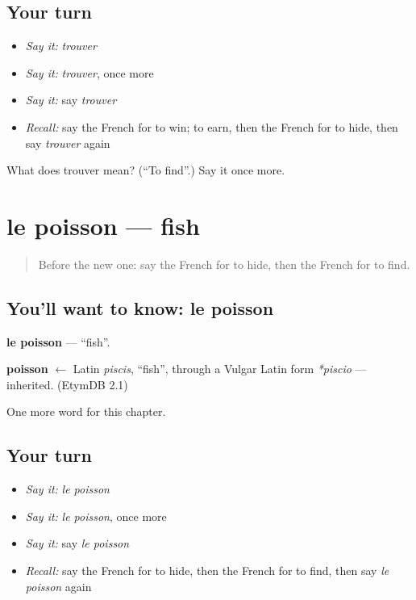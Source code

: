 \subsection*{Your turn}
\begin{itemize}
\raggedright
  \item \emph{Say it:} \emph{trouver}
  \item \emph{Say it:} \emph{trouver}, once more
  \item \emph{Say it:} say \emph{trouver}
  \item \emph{Recall:} say the French for to win; to earn, then the French for to hide, then say \emph{trouver} again
\end{itemize}

\begin{tcolorbox}[breakable,colback=teal!4,colframe=teal!35!black,title={Before you move on}]
What does trouver mean? (\textquotedblleft{}To find\textquotedblright{}.) Say it once more.
\end{tcolorbox}
\section[le poisson]{le poisson — fish}

\label{lesson:FR-C67-poisson}



\begin{quote}
Before the new one: say the French for to hide, then the French for to find.
\end{quote}

\subsection*{You'll want to know: le poisson}
\textbf{le poisson} — \textquotedblleft{}fish\textquotedblright{}.

\begin{cousinweb}
\textbf{poisson} $\leftarrow$ Latin \emph{piscis}, \textquotedblleft{}fish\textquotedblright{}, through a Vulgar Latin form \emph{*piscio} — inherited. (EtymDB 2.1)
\end{cousinweb}

\begin{grammarlens}[title={What you've built}]
One more word for this chapter.
\end{grammarlens}

\subsection*{Your turn}
\begin{itemize}
\raggedright
  \item \emph{Say it:} \emph{le poisson}
  \item \emph{Say it:} \emph{le poisson}, once more
  \item \emph{Say it:} say \emph{le poisson}
  \item \emph{Recall:} say the French for to hide, then the French for to find, then say \emph{le poisson} again
\end{itemize}


